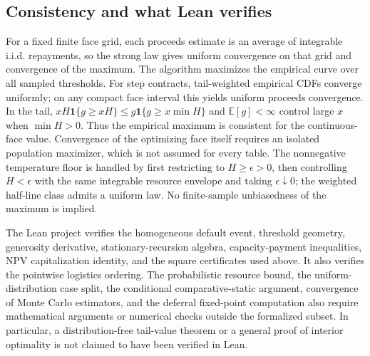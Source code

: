 \documentclass[11pt]{article}
\newcommand{\E}{\mathbb E}
\newcommand{\ind}{\mathbf 1}
\begin{document}
\subsection{Consistency and what Lean verifies}
For a fixed finite face grid, each proceeds estimate is an average of integrable i.i.d. repayments, so the strong law gives uniform convergence on that grid and convergence of the maximum. The algorithm maximizes the empirical curve over all sampled thresholds. For step contracts, tail-weighted empirical CDFs converge uniformly; on any compact face interval this yields uniform proceeds convergence. In the tail, $xH\ind\{g\ge xH\}\le g\ind\{g\ge x\min H\}$ and $\E[g]<\infty$ control large $x$ when $\min H>0$. Thus the empirical maximum is consistent for the continuous-face value. Convergence of the optimizing face itself requires an isolated population maximizer, which is not assumed for every table. The nonnegative temperature floor is handled by first restricting to $H\ge\epsilon>0$, then controlling $H<\epsilon$ with the same integrable resource envelope and taking $\epsilon\downarrow0$; the weighted half-line class admits a uniform law. No finite-sample unbiasedness of the maximum is implied.

The Lean project verifies the homogeneous default event, threshold geometry, generosity derivative, stationary-recursion algebra, capacity-payment inequalities, NPV capitalization identity, and the square certificates used above. It also verifies the pointwise logistics ordering. The probabilistic resource bound, the uniform-distribution case split, the conditional comparative-static argument, convergence of Monte Carlo estimators, and the deferral fixed-point computation also require mathematical arguments or numerical checks outside the formalized subset. In particular, a distribution-free tail-value theorem or a general proof of interior optimality is not claimed to have been verified in Lean.


\printbibliography
\end{document}
